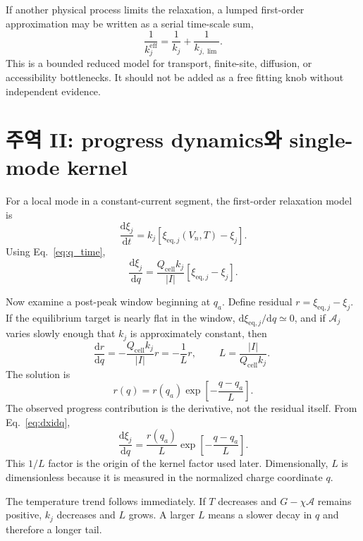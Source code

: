 \documentclass[11pt,a4paper]{article}
\newcommand{\dd}{\mathrm{d}}
\newcommand{\eff}{\mathrm{eff}}
\newcommand{\eq}{\mathrm{eq}}
\newcommand{\cell}{\mathrm{cell}}
\begin{document}
If another physical process limits the relaxation, a lumped first-order approximation may be written as a serial time-scale sum,
\begin{equation}
\frac{1}{k_j^{\eff}}=\frac{1}{k_j}+\frac{1}{k_{j,\lim}}.
\label{eq:kphys}
\end{equation}
This is a bounded reduced model for transport, finite-site, diffusion, or accessibility bottlenecks. It should not be added as a free fitting knob
without independent evidence.

\section{주역 II: progress dynamics와 single-mode kernel}\label{sec:dyn}
For a local mode in a constant-current segment, the first-order relaxation model is
\begin{equation}
\frac{\dd\xi_j}{\dd t}=k_j[\xi_{\eq,j}(V_n,T)-\xi_j].
\label{eq:dxidt}
\end{equation}
Using Eq.~\eqref{eq:q_time},
\begin{equation}
\frac{\dd\xi_j}{\dd q}=\frac{Q_{\cell}k_j}{|I|}[\xi_{\eq,j}-\xi_j].
\label{eq:dxidq}
\end{equation}

Now examine a post-peak window beginning at $q_a$. Define residual $r=\xi_{\eq,j}-\xi_j$. If the equilibrium target is nearly flat in the
window, $\dd\xi_{\eq,j}/\dd q\simeq0$, and if $\mathcal A_j$ varies slowly enough that $k_j$ is approximately constant, then
\begin{equation}
\frac{\dd r}{\dd q}=-\frac{Q_{\cell}k_j}{|I|}r=-\frac{1}{L}r,
\qquad
\boxed{\;L=\frac{|I|}{Q_{\cell}k_j}.\;}
\label{eq:Ldef}
\end{equation}
The solution is
\begin{equation}
r(q)=r(q_a)\exp\left[-\frac{q-q_a}{L}\right].
\label{eq:residual_decay}
\end{equation}
The observed progress contribution is the derivative, not the residual itself. From Eq.~\eqref{eq:dxidq},
\begin{equation}
\boxed{\;\frac{\dd\xi_j}{\dd q}=\frac{r(q_a)}{L}\exp\left[-\frac{q-q_a}{L}\right].\;}
\label{eq:single_dxidq}
\end{equation}
This $1/L$ factor is the origin of the kernel factor used later. Dimensionally, $L$ is dimensionless because it is measured in the normalized
charge coordinate $q$.

The temperature trend follows immediately. If $T$ decreases and $G-\chi\mathcal A$ remains positive, $k_j$ decreases and $L$ grows.
A larger $L$ means a slower decay in $q$ and therefore a longer tail.
\end{document}
